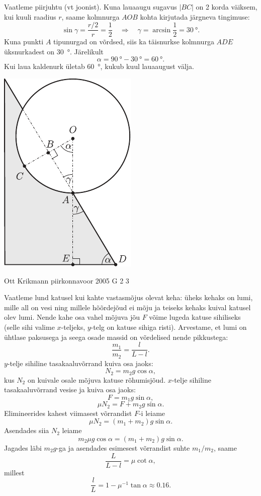 \documentclass[11pt]{article}
\begin{document}
{{Vaatleme piirjuhtu (vt joonist). Kuna lauaaugu sugavus $|BC|$ on 2 korda väiksem, kui kuuli raadius $r$, saame kolmnurga $AOB$ kohta kirjutada järgneva tingimuse:
\[
\sin \gamma=\frac{r / 2}{r}=\frac{1}{2} \quad \Rightarrow \quad \gamma=\arcsin \frac{1}{2}=\SI{30}{\degree}.
\]
Kuna punkti $A$ tipunurgad on võrdsed, siis ka täisnurkse kolmnurga $ADE$ üksnurkadest on \SI{30}{\degree}. Järelikult
\[
\alpha = \SI{90}{\degree} - \SI{30}{\degree} = \SI{60}{\degree}.
\]
Kui laua kaldenurk ületab \SI{60}{\degree}, kukub kuul lauaaugust välja.
\begin{center}
	\includegraphics[width=0.35\linewidth]{2005-lahg-03-lah}
\end{center}
\fi
}

{Ott Krikmann} %
{piirkonnavoor} %
{2005} %
{G 2} %
{3} %
{

\ifSolution
Vaatleme lund katusel kui kahte vastasmõjus olevat keha: üheks kehaks on lumi, mille all on vesi ning millele hõõrdejõud ei mõju ja teiseks kehaks kuival katusel olev lumi. Nende kahe osa vahel mõjuva jõu $F$ võime lugeda katuse sihiliseks (selle sihi valime $x$-teljeks, $y$-telg on katuse sihiga risti). Arvestame, et lumi on ühtlase paksusega ja seega osade massid on võrdelised nende pikkustega: 
\[
\frac{m_1}{m_2} = \frac{l}{L-l}.
\]
$y$-telje sihiline tasakaaluvõrrand kuiva osa jaoks:
\[
N_2 = m_2g \cos \alpha,
\]
kus $N_2$ on kuivale osale mõjuva katuse rõhumisjõud. $x$-telje sihiline tasakaaluvõrrand vesise ja kuiva osa jaoks:
\[
F = m_1g \sin \alpha,
\]
\[
\mu N_2 = F + m_2g \sin \alpha.
\]
Elimineerides kahest viimasest võrrandist $F$-i leiame
\[
\mu N_2 = (m_1 + m_2) g \sin \alpha.
\]
Asendades siia $N_2$ leiame
\[
m_2\mu g \cos \alpha = (m_1 + m_2) g \sin \alpha.
\]
Jagades läbi $m_2g$-ga ja asendades esimesest võrrandist suhte $m_1/m_2$, saame
\[
\frac{L}{L-l}=\mu \cot \alpha,
\]
millest
\[
\frac{l}{L}=1-\mu^{-1} \tan \alpha \approx \num{0,16}.
\]

}}
\end{document}
